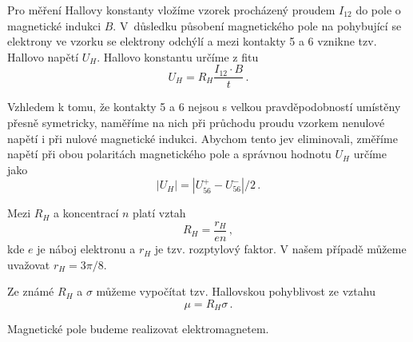 Pro měření Hallovy konstanty vložíme vzorek procházený proudem $I_{12}$ do pole o magnetické indukci $B$.
V~důsledku působení magnetického pole na pohybující se elektrony ve vzorku se elektrony odchýlí a mezi kontakty 5 a 6 vznikne tzv. Hallovo napětí $U_H$.
Hallovo konstantu určíme z fitu \cite{skripta}
\begin{equation}
U_H=R_H\frac{I_{12} \cdot B}{t} \,.
\end{equation}

Vzhledem k tomu, že kontakty 5 a 6 nejsou s velkou pravděpodobností umístěny přesně symetricky, naměříme na nich při průchodu proudu vzorkem nenulové napětí i při nulové magnetické indukci.
Abychom tento jev eliminovali, změříme napětí při obou polaritách magnetického pole a správnou hodnotu $U_H$ určíme jako
\begin{equation}
| U_H |=|U_{56}^+ - U_{56}^-|/2 \,.
\end{equation}

Mezi $R_H$ a koncentrací $n$ platí vztah \cite{skripta}
\begin{equation} \label{eq:koncentrace}
R_H = \frac{r_H}{en} \,,
\end{equation}
kde $e$ je náboj elektronu a $r_H$ je tzv. rozptylový faktor.
V našem případě můžeme uvažovat $r_H = 3\pi/8$. \cite{skripta}

Ze známé $R_H$ a $\sigma$ můžeme vypočítat tzv. Hallovskou pohyblivost ze vztahu \cite{skripta}
\begin{equation} \label{eq:pohyblivost}
\mu = R_H \sigma \,.
\end{equation}

Magnetické pole budeme realizovat elektromagnetem.